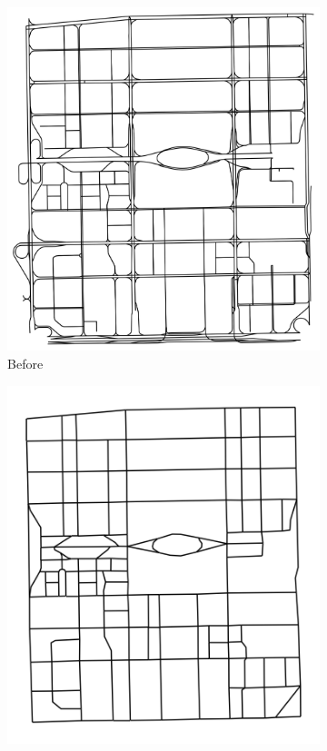 \begin{figure}[htb]
  \centering
  \caption{Road network graph before and after simplification.}
  \label{fig: graph}
  \begin{subfigure}[t]{0.45\linewidth}
      \centering
      \includegraphics[width=\textwidth]{images/graph_before.png}
      \caption{Before}
      \label{fig: graph_before}
  \end{subfigure}
  \begin{subfigure}[t]{0.45\linewidth}
      \centering
      \includegraphics[width=\textwidth]{images/graph_after.png}

\end{subfigure}
\end{figure}
